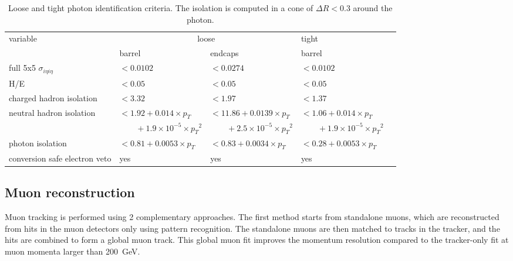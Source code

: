 \renewcommand{\arraystretch}{1.1}
\begin{table}[ht!]
\centering
\footnotesize
\begin{tabular}{|l|l|l||l|c|}
\hline
\multirow{2}{*}{variable}                             &  \multicolumn{2}{c||}{loose} & tight \\
\cline{2-4}
                                                            &  barrel        & endcaps  &  barrel  \\
\hline
full 5x5 $\sigma_{i\eta i\eta}$            & $< 0.0102$                                                  & $< 0.0274$    & $< 0.0102$     \\
H/E                                        & $< 0.05$                                                    & $< 0.05$     & $< 0.05$      \\
charged hadron isolation                   & $< 3.32$                                                    & $< 1.97$    & $< 1.37$    \\
\multirow{2}{*}{neutral hadron isolation}  & $< 1.92 + 0.014\times p_T$ & $< 11.86 + 0.0139\times p_T$ & $< 1.06 + 0.014\times p_T$  \\
					   & $\qquad +1.9\times 10^{-5} \times {p_T}^2$ 			 & $\qquad +2.5\times 10^{-5} \times {p_T}^2$ & $\qquad +1.9\times 10^{-5} \times {p_T}^2$ \\
photon isolation                           & $< 0.81 + 0.0053\times p_T$                                 & $< 0.83 + 0.0034\times p_T$ & $< 0.28 + 0.0053\times p_T$   \\
conversion safe electron veto              & yes                                                         & yes        & yes       \\
\hline
\end{tabular}
\caption{Loose and tight photon identification criteria. The isolation is computed in a cone of $\Delta R < 0.3$ around the photon.}
\label{tab:PhotonID}
\end{table}

\subsection{Muon reconstruction}
\label{sec:muon_reconstruction}

Muon tracking is performed using 2 complementary approaches. The first method starts from standalone muons, which are reconstructed from hits in the muon detectors only using pattern recognition. The standalone muons are then matched to tracks in the tracker, and the hits are combined to form a global muon track. This global muon fit improves the momentum resolution compared to the tracker-only fit at muon momenta larger than \SI{200}{GeV}.

